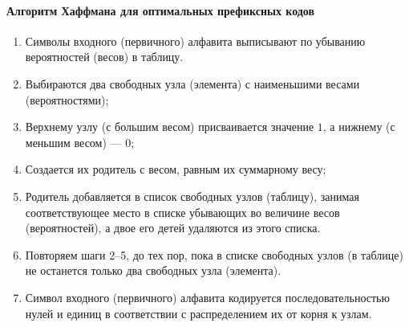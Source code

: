 \paragraph{Алгоритм Хаффмана для оптимальных префиксных кодов}\label{par:huffman-algo-optimal}

\begin{enumerate}
    \item Символы входного (первичного) алфавита выписывают по убыванию вероятностей (весов) в таблицу.
    \item Выбираются два свободных узла (элемента) с наименьшими весами (вероятностями);
    \item Верхнему узлу (с большим весом) присваивается значение $1$, а нижнему (с меньшим весом) --- $0$;
    \item Создается их родитель с весом, равным их суммарному весу;
    \item Родитель добавляется в список свободных узлов (таблицу), занимая соответствующее место в списке убывающих во величине весов (вероятностей), а двое его детей удаляются из этого списка.
    \item Повторяем шаги 2--5, до тех пор, пока в списке свободных узлов (в таблице) не останется только два свободных узла (элемента).
    \item Символ входного (первичного) алфавита кодируется последовательностью нулей и единиц в соответствии с распределением их от корня к узлам.
\end{enumerate}

